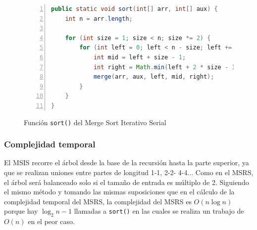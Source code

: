 \documentclass[titlepage]{article}
\begin{document}
\begin{figure}[hbtp]
    \begin{lstlisting}[language=java, frame=single, numbers=left]
public static void sort(int[] arr, int[] aux) {
	int n = arr.length;
	
	for (int size = 1; size < n; size *= 2) {
		for (int left = 0; left < n - size; left += 2 * size) {
			int mid = left + size - 1;
			int right = Math.min(left + 2 * size - 1, n - 1);
			merge(arr, aux, left, mid, right);
		}
	}
}
    \end{lstlisting}
    \caption{Función \lstinline{sort()} del Merge Sort Iterativo Serial}
    \label{fig:MSIS_sort()}
\end{figure}

\subsubsection{Complejidad temporal}%
El MSIS recorre el árbol desde la base de la recursión hasta la parte superior, ya que se realizan uniones entre partes de longitud 1-1, 2-2- 4-4... Como en el MSRS, el árbol será balanceado solo si el tamaño de entrada es múltiplo de 2. Siguiendo el mismo método y tomando las mismas suposiciones que en el cálculo de la complejidad temporal del MSRS, la complejidad del MSRS es \(O(n \log{n})\) porque hay \(\log_2{n}-1\) llamadas a \lstinline|sort()| en las cuales se realiza un trabajo de \(O(n)\) en el peor caso.
\end{document}
